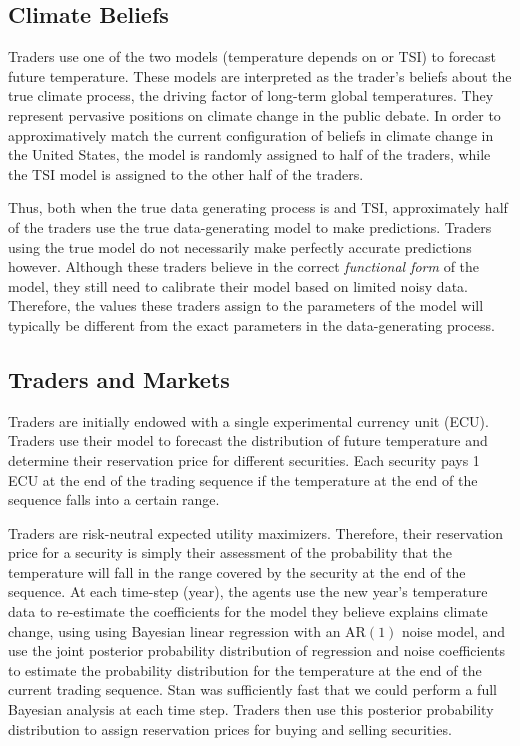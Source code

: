 \documentclass{wscpaperproc}\usepackage[]{graphicx}\usepackage[]{color}
\newcommand{\AR}{\text{AR}}
\begin{document}
\subsection{Climate Beliefs}

Traders use one of the two models (temperature depends on  or TSI) to forecast future temperature. 
These models are interpreted as the trader's beliefs about the true climate process, the driving factor of long-term global temperatures. 
They represent pervasive positions on climate change in the public debate. In order to approximatively match the current configuration of beliefs in climate change in the United States, the  model is randomly assigned to half of the traders, while the TSI model is assigned to the other half of the traders.

Thus, both when the true data generating process is  and TSI, approximately half of the traders use the true data-generating model to make predictions. 
Traders using the true model do not necessarily make perfectly accurate predictions however. 
Although these traders believe in the correct \emph{functional form\/} of the model, they still need to calibrate their model based on limited noisy data. 
Therefore, the values these traders assign to the parameters of the model will typically be different from the exact parameters in the data-generating process.

\subsection{Traders and Markets}

Traders are initially endowed with a single experimental currency unit (ECU). 
Traders use their model to forecast the distribution of future temperature and determine their reservation price for different securities. Each security pays 1 ECU at the end of the trading sequence if the temperature at the end of the sequence falls into a certain range.

Traders are risk-neutral expected utility maximizers. 
Therefore, their reservation price for a security is simply their assessment of the probability that the temperature will fall in the range covered by the security at the end of the sequence.
At each time-step (year), the agents use the new year's temperature data to re-estimate the coefficients for the model they believe explains climate change, using using Bayesian linear regression with an $\AR(1)$ noise model, and use the joint posterior probability distribution of regression and noise coefficients to estimate the probability distribution for the  temperature at the end of the current trading sequence. Stan was sufficiently fast that we could perform a full Bayesian analysis at each time step. Traders then use this posterior probability distribution to assign reservation prices for buying and selling securities.
\end{document}

